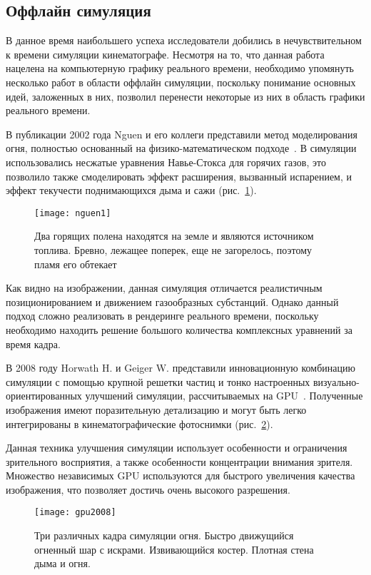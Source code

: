 \subsection{Оффлайн симуляция}
В данное время наибольшего успеха исследователи добились в нечувствительном к
времени симуляции кинематографе. Несмотря на то, что данная работа нацелена на
компьютерную графику реального времени, необходимо упомянуть несколько работ в
области оффлайн симуляции, поскольку понимание основных идей, заложенных в них,
позволил перенести некоторые из них в область графики реального времени.

В публикации 2002 года Nguen и его коллеги представили метод моделирования огня,
полностью основанный на физико-математическом подходе~\cite{nguen2002}. В
симуляции использовались несжатые уравнения Навье-Стокса для горячих газов, это
позволило также смоделировать эффект расширения, вызванный испарением, и эффект
текучести поднимающихся дыма и сажи (рис.~\ref{fig:nguen}).
\begin{figure}[htb]
	\centering
	\texttt{[image: nguen1]}
    \caption{Два горящих полена находятся на земле и являются источником
    топлива. Бревно, лежащее поперек, еще не загорелось, поэтому пламя его
обтекает}%
    \label{fig:nguen}
\end{figure}
Как видно на изображении, данная симуляция отличается реалистичным
позиционированием и движением газообразных субстанций.  Однако данный подход
сложно реализовать в рендеринге реального времени, поскольку необходимо находить
решение большого количества комплексных уравнений за время кадра.

В 2008 году Horwath H\@. и Geiger W\@. представили инновационную комбинацию
симуляции с помощью крупной решетки частиц и тонко настроенных
визуально-ориентированных улучшений симуляции, рассчитываемых на
GPU~\cite{Stock:2008:SWF:1400385.1400457}. Полученные изображения имеют
поразительную детализацию и могут быть легко интегрированы в кинематографические
фотоснимки (рис.~\ref{fig:gpu2008}).

Данная техника улучшения симуляции использует особенности и ограничения
зрительного восприятия, а также особенности концентрации внимания зрителя.
Множество независимых GPU используются для быстрого увеличения качества
изображения, что позволяет достичь очень высокого разрешения.
\begin{figure}[htb]
	\centering
	\texttt{[image: gpu2008]}
	\caption{Три различных кадра симуляции огня. Быстро движущийся огненный
	шар с искрами. Извивающийся костер. Плотная стена дыма и огня.}%
    \label{fig:gpu2008}
\end{figure}

